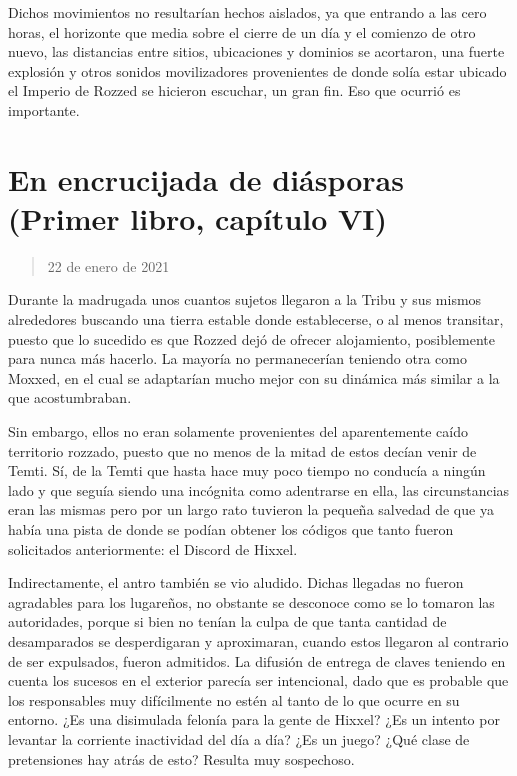 \documentclass[
]{book}
\begin{document}
Dichos movimientos no resultarían hechos aislados, ya que entrando a las cero horas, el horizonte que media sobre el cierre de un día y el comienzo de otro nuevo, las distancias entre sitios, ubicaciones y dominios se acortaron, una fuerte explosión y otros sonidos movilizadores provenientes de donde solía estar ubicado el Imperio de Rozzed se hicieron escuchar, un gran fin. Eso que ocurrió es importante.

\hypertarget{en-encrucijada-de-diuxe1sporas-primer-libro-capuxedtulo-vi}{%
\section{En encrucijada de diásporas (Primer libro, capítulo VI)}\label{en-encrucijada-de-diuxe1sporas-primer-libro-capuxedtulo-vi}}

\begin{quote}
22 de enero de 2021
\end{quote}

Durante la madrugada unos cuantos sujetos llegaron a la Tribu y sus mismos alrededores buscando una tierra estable donde establecerse, o al menos transitar, puesto que lo sucedido es que Rozzed dejó de ofrecer alojamiento, posiblemente para nunca más hacerlo. La mayoría no permanecerían teniendo otra como Moxxed, en el cual se adaptarían mucho mejor con su dinámica más similar a la que acostumbraban.

Sin embargo, ellos no eran solamente provenientes del aparentemente caído territorio rozzado, puesto que no menos de la mitad de estos decían venir de Temti. Sí, de la Temti que hasta hace muy poco tiempo no conducía a ningún lado y que seguía siendo una incógnita como adentrarse en ella, las circunstancias eran las mismas pero por un largo rato tuvieron la pequeña salvedad de que ya había una pista de donde se podían obtener los códigos que tanto fueron solicitados anteriormente: el Discord de Hixxel.

Indirectamente, el antro también se vio aludido. Dichas llegadas no fueron agradables para los lugareños, no obstante se desconoce como se lo tomaron las autoridades, porque si bien no tenían la culpa de que tanta cantidad de desamparados se desperdigaran y aproximaran, cuando estos llegaron al contrario de ser expulsados, fueron admitidos. La difusión de entrega de claves teniendo en cuenta los sucesos en el exterior parecía ser intencional, dado que es probable que los responsables muy difícilmente no estén al tanto de lo que ocurre en su entorno. ¿Es una disimulada felonía para la gente de Hixxel? ¿Es un intento por levantar la corriente inactividad del día a día? ¿Es un juego? ¿Qué clase de pretensiones hay atrás de esto? Resulta muy sospechoso.
\end{document}
